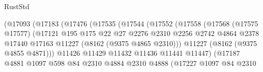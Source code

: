 \begin{lexlean}{RustStd}
\begin{coremodule}
                                    (@17093
                                      (@17183
                                        (@17476
                                          (@17535
                                            (@17544
                                              (@17552
                                                (@17558
                                                  (@17568
                                                    (@17575 @17577)
                                                    (@17121
                                                      @195
                                                      @175
                                                      @22
                                                      @27
                                                      @2276
                                                      @2310
                                                      @2256
                                                      @2742
                                                      @4864
                                                      @2378
                                                      @17440
                                                      @17163
                                                      @11227
                                                      (@8162 (@9375 @4865 @2310)))
                                                    @11227
                                                    (@8162 (@9375 @4855 @4871)))
                                                  @11426
                                                  @11429
                                                  @11432
                                                  @11436
                                                  @11441
                                                  @11447)
                                                (@17187
                                                  @4881
                                                  @1097
                                                  @598
                                                  @84
                                                  @2310
                                                  @4884
                                                  @2310
                                                  @4888
                                                  (@17227
                                                    @1097
                                                    @84
                                                    @2310

\end{coremodule}
\end{lexlean}
